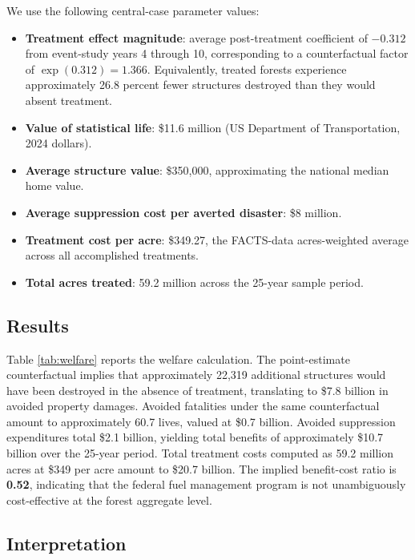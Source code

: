 \documentclass[12pt, letterpaper]{article}
\begin{document}
We use the following central-case parameter values:
\begin{itemize}[leftmargin=*, itemsep=0.2em]
\item \textbf{Treatment effect magnitude}: average post-treatment coefficient of $-0.312$ from event-study years 4 through 10, corresponding to a counterfactual factor of $\exp(0.312) = 1.366$. Equivalently, treated forests experience approximately 26.8 percent fewer structures destroyed than they would absent treatment.
\item \textbf{Value of statistical life}: \$11.6 million (US Department of Transportation, 2024 dollars).
\item \textbf{Average structure value}: \$350{,}000, approximating the national median home value.
\item \textbf{Average suppression cost per averted disaster}: \$8 million.
\item \textbf{Treatment cost per acre}: \$349.27, the FACTS-data acres-weighted average across all accomplished treatments.
\item \textbf{Total acres treated}: 59.2 million across the 25-year sample period.
\end{itemize}

\subsection{Results}



Table \ref{tab:welfare} reports the welfare calculation. The point-estimate counterfactual implies that approximately 22{,}319 additional structures would have been destroyed in the absence of treatment, translating to \$7.8 billion in avoided property damages. Avoided fatalities under the same counterfactual amount to approximately 60.7 lives, valued at \$0.7 billion. Avoided suppression expenditures total \$2.1 billion, yielding total benefits of approximately \$10.7 billion over the 25-year period. Total treatment costs computed as 59.2 million acres at \$349 per acre amount to \$20.7 billion. The implied benefit-cost ratio is \textbf{0.52}, indicating that the federal fuel management program is not unambiguously cost-effective at the forest aggregate level.

\subsection{Interpretation}
\end{document}
